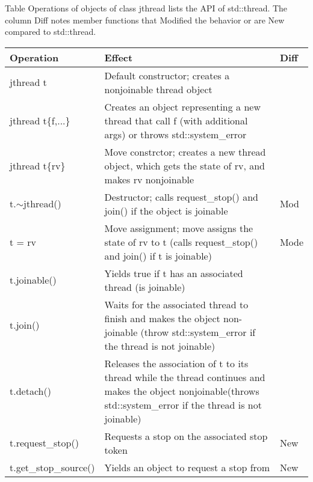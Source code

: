 
Table Operations of objects of class jthread lists the API of std::thread. The column Diff notes member functions that Modified the behavior or are New compared to std::thread.

\begin{longtable}[c]{|l|l|l|}
\hline
\textbf{Operation}      & \textbf{Effect}                                                                                        & \textbf{Diff} \\ \hline
\endfirsthead
%
\endhead
%
jthread t               & Default constructor; creates a nonjoinable thread object                                               &               \\ \hline
jthread t\{f,...\} &
Creates an object representing a new thread that call f (with additional args) or throws std::system\_error &
\\ \hline
jthread t\{rv\}         & Move constrctor; creates a new thread object, which gets the state of rv, and makes rv nonjoinable     &               \\ \hline
t.$\sim$jthread()       & Destructor; calls request\_stop() and join() if the object is joinable                                 & Mod           \\ \hline
t = rv                  & Move assignment; move assigns the state of rv to t (calls request\_stop() and join() if t is joinable) & Mode          \\ \hline
t.joinable()            & Yields true if t has an associated thread (is joinable)                                                &               \\ \hline
t.join() &
Waits for the associated thread to finish and makes the object non-joinable (throw std::system\_error if the thread is not joinable) &
\\ \hline
t.detach() &
Releases the association of t to its thread while the thread continues and makes the object nonjoinable(throws std::system\_error if the thread is not joinable) &
\\ \hline
t.request\_stop()       & Requests a stop on the associated stop token                                                           & New           \\ \hline
t.get\_stop\_source()   & Yields an object to request a stop from                                                                & New           \\ \hline

\end{longtable}
